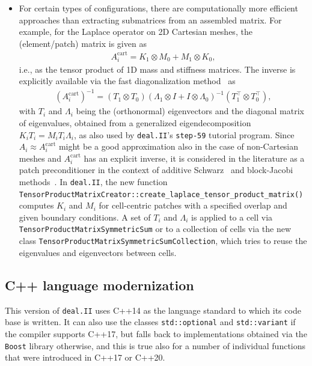 \documentclass{ansarticle-preprint}
\newcommand{\specialword}[1]{\texttt{#1}}
\newcommand{\dealii}{{\specialword{deal.II}}\xspace}
\newcommand{\boost}{{\specialword{Boost}}\xspace}
\begin{document}
\begin{itemize}
  \item For certain types of configurations, there are computationally more efficient
  approaches than extracting submatrices from an assembled matrix. For
  example, for the Laplace
  operator on 2D Cartesian meshes, the (element/patch) matrix is given as
  \begin{align*}
  A_i^{\text{cart}} = K_1 \otimes M_0 + M_1 \otimes K_0,
  \end{align*}
  i.e., as the tensor product of 1D mass and stiffness matrices. The inverse is
  explicitly available via the fast diagonalization method~\cite{lynch1964direct} as
  \begin{align*}
  \left(A_i^{\text{cart}}\right)^{-1} = (T_1 \otimes T_0) (\Lambda_1 \otimes I + I \otimes \Lambda_0)^{-1} (T_1^\top \otimes T_0^\top),
  \end{align*}
  with $T_i$ and $\Lambda_i$ being the (orthonormal) eigenvectors and the diagonal
  matrix of eigenvalues, obtained from a generalized eigendecomposition
  $K_iT_i =  M_i T_i \Lambda_i$, as also used by \dealii's \texttt{step-59} tutorial program.
  Since $A_i \approx A_i^{\text{cart}}$
  might be a good approximation also in the case of non-Cartesian meshes and
  $A_i^{\text{cart}}$ has an explicit inverse, it is considered in the
  literature as a patch preconditioner in the context of additive
  Schwarz~\cite{witte2021fast, phillips2021auto, couzy1995spectral} and block-Jacobi methods~\cite{kronbichler2019hermite}.
  In \dealii, the new function
  \texttt{Tensor\-Product\-Matrix\-Creator::create\_\allowbreak laplace\_\allowbreak tensor\_\allowbreak product\_\allowbreak matrix()} computes $K_i$ and $M_i$
  for cell-centric patches with a specified overlap and given boundary conditions.
  A set of $T_i$ and $\Lambda_i$ is applied to a cell via
  \texttt{Tensor\-Product\-Matrix\-Symmetric\-Sum} or to a collection of cells
  via the new class \texttt{Tensor\-Product\-Matrix\-Symmetric\-Sum\-Collection}, which
  tries to reuse the eigenvalues and eigenvectors between cells.
\end{itemize}


\subsection{C++ language modernization}\label{sec:language}

This version of \dealii{} uses C++14 as the language standard to which its
code base is written. It can also use the classes
\texttt{std::optional} and \texttt{std::variant} if the compiler
supports C++17, but falls back to implementations obtained via the
\boost library otherwise, and this is true also for a number of
individual functions that were introduced in C++17 or C++20.
\end{document}

